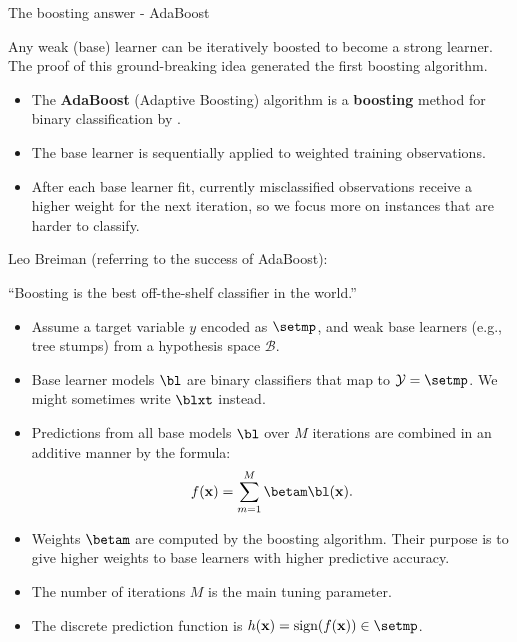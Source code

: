 \documentclass[11pt,compress,t,notes=noshow, xcolor=table]{beamer}
\begin{document}


\begin{vbframe}{The boosting answer - AdaBoost}

Any weak (base) learner can be iteratively boosted to become
a strong learner. %
The proof of this ground-breaking idea generated the first boosting algorithm.

\begin{itemize}
  \item The \textbf{AdaBoost} (Adaptive Boosting) algorithm is a \textbf{boosting} method
    for binary classification by .
  \item The base learner is sequentially applied to weighted training observations.
  \item After each base learner fit, currently misclassified observations receive a higher weight for
    the next iteration, so we focus more on instances that are harder to classify.
\end{itemize}

Leo Breiman (referring to the success of AdaBoost):

\enquote{Boosting is the best off-the-shelf classifier in the world.}

\framebreak

\begin{itemize}
  \item Assume a target variable $y$ encoded as $\setmp$,
    and weak base learners (e.g., tree stumps) from a hypothesis space $\mathcal{B}$.
  \item Base learner models $\bl$ are binary classifiers that map to $\Yspace = \setmp$.
    We might sometimes write $\blxt$ instead.
  \item Predictions from all base models $\bl$ over $M$ iterations are combined in an additive manner by the formula:
    $$
    \fx = \sum_{m=1}^{M} \betam \bl(\xv).
    $$
  \item Weights $\betam$ are computed by the boosting algorithm.
    Their purpose is to give higher weights to base learners with higher predictive accuracy.
  \item The number of iterations $M$ is the main tuning parameter.
  \item The discrete prediction function is $h(\xv) = \text{sign}(\fx) \in \setmp$.
\end{itemize}


\end{vbframe}
\end{document}
